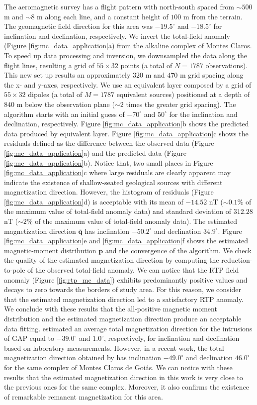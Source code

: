 The aeromagnetic survey has a flight pattern with north-south spaced from $\sim 500$ m and $ \sim 8$ m along each line, and a constant height of $100$ m from the terrain. The geomagnetic field direction for this area was $-19.5^\circ$ and $-18.5^\circ$ for inclination and declination, respectively. We invert the total-field anomaly (Figure \ref{fig:mc_data_application}a) from the alkaline complex of Montes Claros. To speed up data processing and inversion, we downsampled the data along the flight lines, resulting a grid of $55 \times 32$ points (a total of $N=1787$ observations). This new set up results an approximately $320$ m and $470$ m grid spacing along the x- and y-axes, respectively. We use an equivalent layer composed by a grid of $55 \times 32$ dipoles (a total of $M=1787$ equivalent sources) positioned at a depth of $840$ m below the observation plane ($\sim 2$ times the greater grid spacing). The algorithm starts with an initial guess of $-70^\circ$ and $50^\circ$ for the inclination and declination, respectively. Figure \ref{fig:mc_data_application}b shows the predicted data produced by equivalent layer. Figure \ref{fig:mc_data_application}c shows the residuals defined as the difference between the observed data (Figure \ref{fig:mc_data_application}a) and the predicted data (Figure \ref{fig:mc_data_application}b). Notice that, two small places in Figure \ref{fig:mc_data_application}c where large residuals are clearly apparent may indicate the existence of shallow-seated geological sources with different magnetization direction. However, the histogram of residuals (Figure \ref{fig:mc_data_application}d) is acceptable with its mean of $-14.52$ nT ($\sim 0.1\% $ of the maximum value of total-field anomaly data) and standard deviation of $312.28$ nT ($\sim 2 \% $ of the maximum value of total-field anomaly data). The estimated magnetization direction $\bar{\mathbf{q}}$ has inclination $-50.2^\circ$ and declination $34.9^\circ$. Figure \ref{fig:mc_data_application}e and \ref{fig:mc_data_application}f shows the estimated magnetic-moment distribution $\bar{\mathbf{p}}$ and the convergence of the algorithm. We check the quality of the estimated magnetization direction by computing the reduction-to-pole of the observed total-field anomaly. We can notice that the RTP field anomaly (Figure \ref{fig:rtp_mc_data}) exhibits predominantly positive values and decays to zero towards the borders of study area. For this reason, we consider that the estimated magnetization direction led to a satisfactory RTP anomaly. We conclude with these results that the all-positive magnetic moment distribution and the estimated magnetization direction produce an acceptable data fitting. \cite{marangoni_mantovani_2013} estimated an average total magnetization direction for the intrusions of GAP equal to $-39.0^\circ$ and $1.0^\circ$, respectively, for inclination and declination based on laboratory measurements. However, in a recent work, the total magnetization direction obtained by \cite{zhang_etal_2018} has inclination $-49.0^\circ$ and declination $46.0^\circ$ for the same complex of Montes Claros de Goi\'as. We can notice with these results that the estimated magnetization direction in this work is very close to the previous ones for the same complex. Moreover, it also confirms the existence of remarkable remanent magnetization for this area. 


